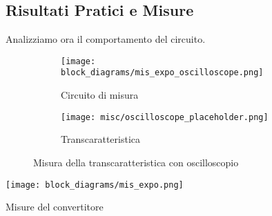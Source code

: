 \subsection*{Risultati Pratici e Misure}


Analizziamo ora il comportamento del circuito.

\begin{figure}[H]
    \centering

    \begin{subfigure}{.5\textwidth}
        \centering
        \texttt{[image: block\_diagrams/mis\_expo\_oscilloscope.png]}
        \caption{Circuito di misura}
        \label{mis_expo_oscilloscope}
    \end{subfigure}%
    \begin{subfigure}{.5\textwidth}
        \centering
        \texttt{[image: misc/oscilloscope\_placeholder.png]}
        \caption{Transcaratteristica}
        \label{expo_transcharacteristic}
    \end{subfigure}

    \caption{Misura della transcaratteristica con oscilloscopio}
\end{figure}

\begin{minipage}{0.49\textwidth}
    \centering
    \texttt{[image: block\_diagrams/mis\_expo.png]}
    \label{mis_expo}
\end{minipage}
\begin{minipage}{0.49\textwidth}
    \centering
    \begin{table}[H]
        \centering
        \caption{Misure del convertitore}
        \label{expo_table}
    \end{table}
\end{minipage}

